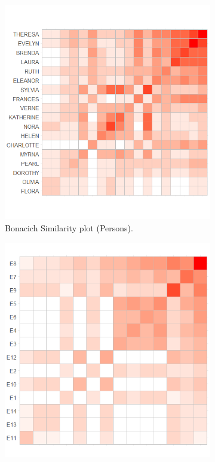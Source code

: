 \documentclass[a4paper,fleqn]{cas-sc}
\begin{document}
\begin{figure}
    \captionsetup[subfigure]{font=footnotesize,labelfont=footnotesize}
    \centering
     \begin{subfigure}[b]{0.425\textwidth}
        \includegraphics[width=1.0\textwidth]{Plots/p-bon-sim.png}
            \caption{Bonacich Similarity plot (Persons).}
            \label{fig:p-bon-sim}
    \end{subfigure}
     \begin{subfigure}[b]{0.4\textwidth}
        \includegraphics[width=1.0\textwidth]{Plots/g-bon-sim.png}

\end{subfigure}
\end{figure}
\end{document}
